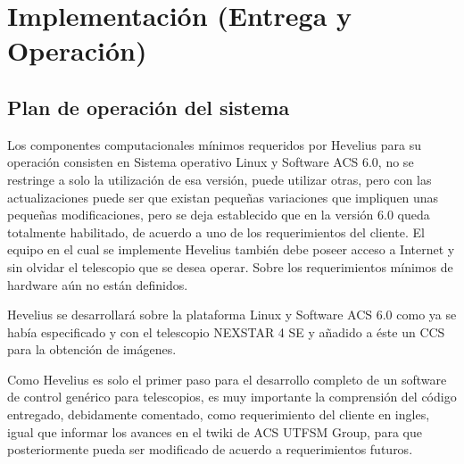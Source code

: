 \documentclass[letterpaper,spanish,10pt]{article}
\begin{document}
\newpage
\section{Implementaci\'on (Entrega y Operaci\'on)} %
\subsection{Plan de operaci\'on del sistema}
Los componentes computacionales m\'inimos requeridos por Hevelius para su operaci\'on consisten en Sistema operativo Linux y Software ACS 6.0, no se restringe a solo la utilizaci\'on de esa versi\'on, puede utilizar otras, pero con las actualizaciones puede ser que existan peque\~nas variaciones que impliquen unas peque\~nas modificaciones, pero se deja establecido que en la versi\'on 6.0 queda totalmente habilitado, de acuerdo a uno de los requerimientos del cliente.
El equipo en el cual se implemente Hevelius tambi\'en debe poseer acceso a Internet y sin olvidar el telescopio que se desea operar. Sobre los requerimientos m\'inimos de hardware a\'un no est\'an definidos.

Hevelius se desarrollar\'a sobre la plataforma Linux y Software ACS 6.0 como ya se hab\'ia especificado y con el telescopio NEXSTAR 4 SE y a\~nadido a \'este un CCS para la obtenci\'on de im\'agenes. 

Como Hevelius es solo el primer paso para el desarrollo completo de un software  de control gen\'erico para telescopios, es muy importante la comprensi\'on del c\'odigo entregado, debidamente comentado, como requerimiento del cliente en ingles, igual que informar los avances en  el twiki de ACS UTFSM Group, para que posteriormente pueda ser modificado de acuerdo a requerimientos futuros.
\end{document}

